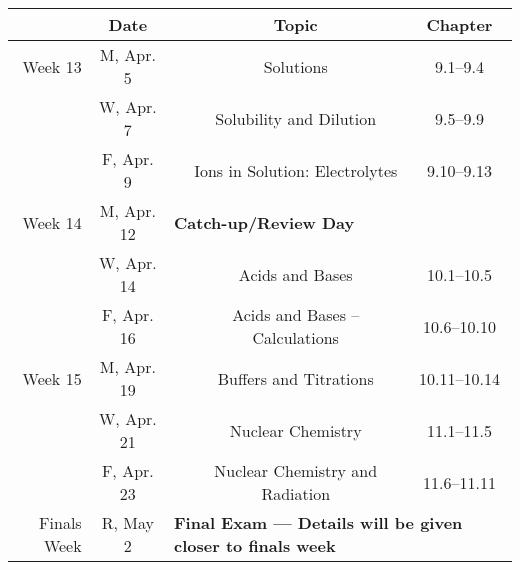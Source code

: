 \documentclass[12pt, letterpaper]{article}
\begin{document}
\noindent
\begin{tabular}{rcccc}
& Date && Topic & Chapter\\
	\midrule
	Week 13 & M, Apr. 5&& Solutions & 9.1--9.4\\
	& W, Apr. 7&& Solubility and Dilution & 9.5--9.9\\
	& F, Apr. 9&& Ions in Solution: Electrolytes & 9.10--9.13\\
	\midrule
	Week 14 & M, Apr. 12& \multicolumn{3}{l}{\textbf{Catch-up/Review Day}}\\
	& W, Apr. 14&& Acids and Bases & 10.1--10.5\\
	& F, Apr. 16&& Acids and Bases -- Calculations & 10.6--10.10\\
	\midrule
	Week 15 & M, Apr. 19&& Buffers and Titrations & 10.11--10.14\\
	& W, Apr. 21&& Nuclear Chemistry & 11.1--11.5\\
	& F, Apr. 23&& Nuclear Chemistry and Radiation & 11.6--11.11\\
	\midrule
	Finals Week& R, May 2& \multicolumn{3}{l}{\textbf{Final Exam --- Details will be given closer to finals week}}\\
\end{tabular}
\end{document}
